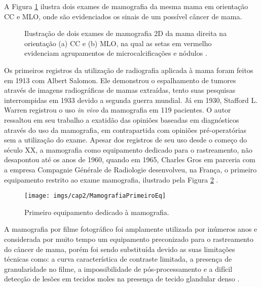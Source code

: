 A Figura \ref{fig:imgCap2ExameMamografia} ilustra dois exames de mamografia da mesma mama em orientação \ac{CC} e \ac{MLO}, onde são evidenciados os sinais de um possível câncer de mama.

\begin{figure}[htb]
	\centering
	
	\caption{Ilustração de dois exames de mamografia \acs{2D} da mama direita na orientação (a) \acs{CC} e (b) \acs{MLO}, na qual as setas em vermelho evidenciam agrupamentos de microcalcificações e nódulos .}
	
	\hfil
	
	\label{fig:imgCap2ExameMamografia}
\end{figure}

Os primeiros registros da utilização de radiografia aplicada à mama foram feitos em 1913 com Albert Salomon. Ele demonstrou o espalhamento de tumores através de imagens radiográficas de mamas extraídas, tento suas pesquisas interrompidas em 1933 devido a segunda guerra mundial. Já em 1930, Stafford L. Warren registrou o uso  \textit{in vivo} da mamografia em 119 pacientes. O autor ressaltou em seu trabalho a exatidão das opiniões baseadas em diagnósticos através do uso da mamografia, em contrapartida com opiniões pré-operatórias sem a utilização do exame. Apesar dos registros de seu uso desde o começo do século XX, a mamografia como equipamento dedicado para o rastreamento, não desapontou até os anos de 1960, quando em 1965, Charles Gros em parceria com a empresa Compagnie Générale de Radiologie desenvolveu, na França, o primeiro equipamento restrito ao exame mamografia, ilustrado pela Figura \ref{fig:imgCap2MamografiaPrimeiroEq} \cite{bassett1988evolution,gold1990highlights}. 

\begin{figure}[htb]
	\caption{Primeiro equipamento dedicado à mamografia.}
	\begin{center}
		\texttt{[image: imgs/cap2/MamografiaPrimeiroEq]}
	\end{center}
	\label{fig:imgCap2MamografiaPrimeiroEq}
\end{figure}

A mamografia por filme fotográfico foi amplamente utilizada por inúmeros anos e considerada por muito tempo um equipamento preconizado para o rastreamento do câncer de mama, porém foi sendo substituída devido as suas limitações técnicas como: a curva característica de contraste limitada, a presença de granularidade no filme, a impossibilidade de pós-processamento e a difícil detecção de lesões em tecidos moles na presença de tecido glandular denso \cite{karellas2008breast,lewin2001comparison}. 

